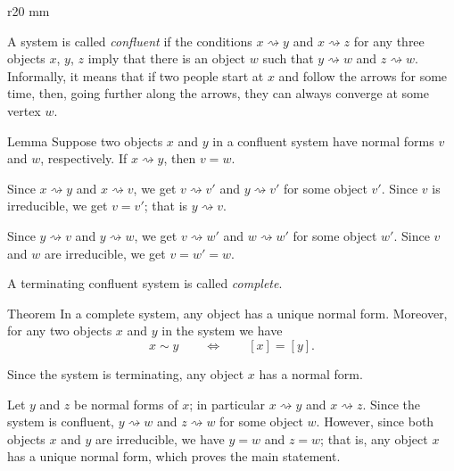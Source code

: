 \begin{wrapfigure}{r}{20 mm}
\vskip-0mm
\centering
{}
\vskip-0mm
\end{wrapfigure}

A system is called \emph{confluent} if the conditions $x\rightsquigarrow  y$ and $x\rightsquigarrow  z$
for any three objects $x$, $y$, $z$ imply that
there is an object $w$ such that $y\rightsquigarrow  w$ and $z\rightsquigarrow  w$.
Informally, it means that if two people start at $x$ and follow the arrows for some time,
then, going further along the arrows, they can always converge at some vertex $w$.


\begin{thm}{Lemma}\label{lem:x->y}
Suppose two objects $x$ and $y$ in a confluent system have normal forms 
$v$ and $w$, respectively.
If $x\rightsquigarrow y$, then $v=w$.
\end{thm}

Since $x\rightsquigarrow y$ and $x\rightsquigarrow v$, we get $v\rightsquigarrow v'$ and $y\rightsquigarrow v'$ for some object $v'$.
Since $v$ is irreducible, we get $v=v'$;
that is $y\rightsquigarrow v$.

Since $y\rightsquigarrow v$ and $y\rightsquigarrow w$, we get $v\rightsquigarrow w'$ and $w\rightsquigarrow w'$ for some object $w'$.
Since $v$ and $w$ are irreducible, we get $v=w'=w$.
\qeds

A terminating confluent system is called \emph{complete}.

\begin{thm}{Theorem}
In a complete system, any object has a unique normal form.
Moreover, for any two objects $x$ and $y$ in the system we have
\[x\sim y\qquad\Longleftrightarrow\qquad [x]=[y].\]

\end{thm}

Since the system is terminating, any object $x$ has a normal form.

Let $y$ and $z$ be normal forms of $x$;
in particular $x\rightsquigarrow y$ and $x\rightsquigarrow z$.
Since the system is confluent, $y\rightsquigarrow w$ and $z\rightsquigarrow w$ for some object $w$.
However, since both objects $x$ and $y$ are irreducible, we have $y= w$ and $z= w$;
that is, any object $x$ has a unique normal form, which proves the main statement.

